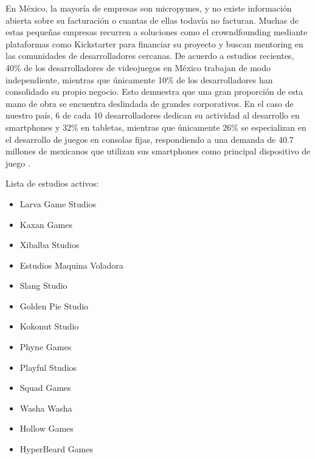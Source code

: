 En México, la mayoría de empresas son micropymes, y no existe información abierta sobre su facturación o cuantas de ellas todavía no facturan. Muchas de estas pequeñas empresas recurren a soluciones como el crowndfounding mediante plataformas como Kickstarter para financiar su proyecto y buscan mentoring en las comunidades de desarrolladores cercanas\cite{vid05}. De acuerdo a estudios recientes, 40\% de los desarrolladores de videojuegos en México trabajan de modo independiente, mientras que únicamente 10\% de los desarrolladores han consolidado su propio negocio. Esto demuestra que una gran proporción de esta mano de obra se encuentra deslindada de grandes corporativos. En el caso de nuestro país, 6 de cada 10 desarrolladores dedican su actividad al desarrollo en smartphones y 32\% en tabletas, mientras que únicamente 26\% se especializan en el desarrollo de juegos en consolas fijas, respondiendo a una demanda de 40.7 millones de mexicanos que utilizan sus smartphones como principal dispositivo de juego \cite{vid04}.

Lista de estudios activos:
\begin{itemize}
	\item Larva Game Studios
	\item Kaxan Games
	\item Xibalba Studios
	\item Estudios Maquina Voladora
	\item Slang Studio
	\item Golden Pie Studio
	\item Kokonut Studio
	\item Phyne Games
	\item Playful Studios
	\item Squad Games
	\item Washa Washa
	\item Hollow Games
	\item HyperBeard Games
	
\end{itemize}
